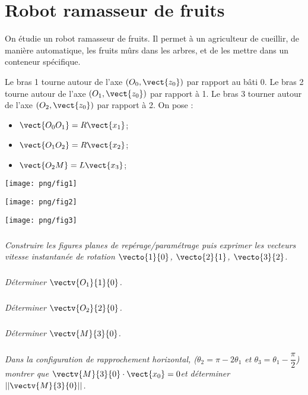 \documentclass[10pt,oneside]{article}
\begin{document}
\section*{Robot ramasseur de fruits} 
On étudie un robot ramasseur de fruits. Il permet à un agriculteur de cueillir, de manière automatique, les fruits mûrs dans les arbres, et de les mettre dans un conteneur spécifique. 

Le bras 1 tourne autour de l'axe $(O_0,\vect{z_0})$ par rapport au bâti 0. Le bras 2 tourne autour de l'axe $(O_1,\vect{z_0})$ par rapport à 1. Le bras 3 tourner autour de l'axe $(O_2,\vect{z_0})$ par rapport à 2. On pose :
\begin{itemize}
\item $\vect{O_0O_1} = R\vect{x_1}$;
\item $\vect{O_1O_2} = R\vect{x_2}$;
\item $\vect{O_2M} = L\vect{x_3}$;
\end{itemize}

\begin{minipage}[c]{.47\linewidth}
\begin{center}
\texttt{[image: png/fig1]}
\end{center}
\end{minipage}\hfill
\begin{minipage}[c]{.47\linewidth}
\begin{center}
\texttt{[image: png/fig2]}
\end{center}
\end{minipage}

\begin{center}
\texttt{[image: png/fig3]}
\end{center}

\subparagraph{}
\textit{Construire les figures planes de repérage/paramétrage puis exprimer les vecteurs vitesse instantanée de rotation $\vecto{1}{0}$, $\vecto{2}{1}$, $\vecto{3}{2}$.} 

\subparagraph{}
\textit{Déterminer $\vectv{O_1}{1}{0}$.}

\subparagraph{}
\textit{Déterminer $\vectv{O_2}{2}{0}$.}

\subparagraph{}
\textit{Déterminer $\vectv{M}{3}{0}$.}

\subparagraph{}
\textit{Dans la configuration de rapprochement horizontal, ($\theta_2=\pi-2\theta_1$ et $\theta_3=\theta_1-\dfrac{\pi}{2}$) montrer que $\vectv{M}{3}{0}\cdot \vect{x_0}=0$et déterminer $||\vectv{M}{3}{0}||$.}
\end{document}
